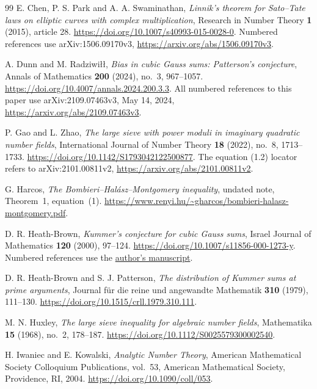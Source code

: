\documentclass[11pt]{article}
\theoremstyle{definition}
\theoremstyle{remark}
\numberwithin{equation}{section}
\begin{document}
\begingroup
\small
\begin{thebibliography}{99}
E. Chen, P. S. Park and A. A. Swaminathan,
\emph{Linnik's theorem for Sato--Tate laws on elliptic curves
with complex multiplication},
Research in Number Theory \textbf{1} (2015), article 28.
\url{https://doi.org/10.1007/s40993-015-0028-0}.
Numbered references use arXiv:1506.09170v3,
\url{https://arxiv.org/abs/1506.09170v3}.

A. Dunn and M. Radziwi\l\l,
\emph{Bias in cubic Gauss sums: Patterson's conjecture},
Annals of Mathematics \textbf{200} (2024), no.~3, 967--1057.
\url{https://doi.org/10.4007/annals.2024.200.3.3}.
All numbered references to this paper use
arXiv:2109.07463v3, May 14, 2024,
\url{https://arxiv.org/abs/2109.07463v3}.

P. Gao and L. Zhao,
\emph{The large sieve with power moduli in imaginary quadratic number fields},
International Journal of Number Theory \textbf{18} (2022), no.~8,
1713--1733.
\url{https://doi.org/10.1142/S1793042122500877}.
The equation (1.2) locator refers to arXiv:2101.00811v2,
\url{https://arxiv.org/abs/2101.00811v2}.

G. Harcos,
\emph{The Bombieri--Hal\'asz--Montgomery inequality},
undated note, Theorem~1, equation~(1).
\url{https://www.renyi.hu/~gharcos/bombieri-halasz-montgomery.pdf}.

D. R. Heath-Brown,
\emph{Kummer's conjecture for cubic Gauss sums},
Israel Journal of Mathematics \textbf{120} (2000), 97--124.
\url{https://doi.org/10.1007/s11856-000-1273-y}.
Numbered references use the
\href{https://www.researchgate.net/publication/254847691}{author's manuscript}.

D. R. Heath-Brown and S. J. Patterson,
\emph{The distribution of Kummer sums at prime arguments},
Journal f\"ur die reine und angewandte Mathematik
\textbf{310} (1979), 111--130.
\url{https://doi.org/10.1515/crll.1979.310.111}.

M. N. Huxley,
\emph{The large sieve inequality for algebraic number fields},
Mathematika \textbf{15} (1968), no.~2, 178--187.
\url{https://doi.org/10.1112/S0025579300002540}.

H. Iwaniec and E. Kowalski,
\emph{Analytic Number Theory},
American Mathematical Society Colloquium Publications, vol.~53,
American Mathematical Society, Providence, RI, 2004.
\url{https://doi.org/10.1090/coll/053}.


\end{thebibliography}
\end{document}
